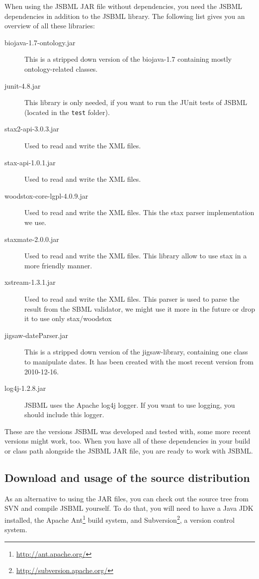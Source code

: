 When using the JSBML JAR file without dependencies, you need the JSBML
dependencies in addition to the JSBML library. The following list gives you an
overview of all these libraries:
\begin{description}
\item[biojava-1.7-ontology.jar] This is a stripped down version of the
biojava-1.7 containing mostly ontology-related classes.
\item[junit-4.8.jar]This library is only needed, if you want to run the JUnit
tests of JSBML (located in the \texttt{test} folder).
\item[stax2-api-3.0.3.jar] Used to read and write the XML files.
\item[stax-api-1.0.1.jar] Used to read and write the XML files.
\item[woodstox-core-lgpl-4.0.9.jar] Used to read and write the XML files. This the stax parser implementation we use.
\item[staxmate-2.0.0.jar] Used to read and write the XML files. This library allow to use stax in a more friendly
manner.
\item[xstream-1.3.1.jar] Used to read and write the XML files. This parser is used to parse
the result from the SBML validator, we might use it more in the future or drop it
to use only stax/woodstox
\item[jigsaw-dateParser.jar] This is a stripped down version of the jigsaw-library,
containing one class to manipulate dates. It has been created with the most
recent version from 2010-12-16.
\item[log4j-1.2.8.jar] JSBML uses the Apache log4j logger. If you want to use
logging, you should include this logger.
\end{description}
These are the versions JSBML was developed and tested with, some more recent
versions might work, too. When you have all of these dependencies in your build
or class path alongside the JSBML JAR file, you are ready to work with JSBML.


\subsection{Download and usage of the source distribution}

As an alternative to using the JAR files, you can check out the source tree from
SVN and compile JSBML yourself. To do that, you will need to have a Java
JDK installed, the Apache
Ant\footnote{\url{http://ant.apache.org/}\label{fn:ant}} build system, and
Subversion\footnote{\url{http://subversion.apache.org/}\label{fn:svn}}, a
version control system.

